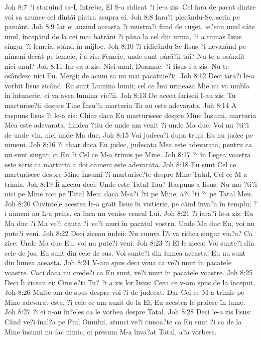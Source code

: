 Joh 8:7  ?i staruind sa-L întrebe, El S-a ridicat ?i le-a zis: Cel fara de pacat dintre voi sa arunce cel dintâi piatra asupra ei.
Joh 8:8  Iara?i plecându-Se, scria pe pamânt.
Joh 8:9  Iar ei auzind aceasta ?i mustra?i fiind de cuget, ie?eau unul câte unul, începând de la cei mai batrâni ?i pâna la cel din urma, ?i a ramas Iisus singur ?i femeia, stând în mijloc.
Joh 8:10  ?i ridicându-Se Iisus ?i nevazând pe nimeni decât pe femeie, i-a zis: Femeie, unde sunt pârâ?ii tai? Nu te-a osândit nici unul?
Joh 8:11  Iar ea a zis: Nici unul, Doamne. ?i Iisus i-a zis: Nu te osândesc nici Eu. Mergi; de acum sa nu mai pacatuie?ti.
Joh 8:12  Deci iara?i le-a vorbit Iisus zicând: Eu sunt Lumina lumii; cel ce Îmi urmeaza Mie nu va umbla în întuneric, ci va avea lumina vie?ii.
Joh 8:13  De aceea fariseii I-au zis: Tu marturise?ti despre Tine Însu?i; marturia Ta nu este adevarata.
Joh 8:14  A raspuns Iisus ?i le-a zis: Chiar daca Eu marturisesc despre Mine Însumi, marturia Mea este adevarata, fiindca ?tiu de unde am venit ?i unde Ma duc. Voi nu ?ti?i de unde vin, nici unde Ma duc.
Joh 8:15  Voi judeca?i dupa trup; Eu nu judec pe nimeni.
Joh 8:16  ?i chiar daca Eu judec, judecata Mea este adevarata, pentru ca nu sunt singur, ci Eu ?i Cel ce M-a trimis pe Mine.
Joh 8:17  ?i în Legea voastra este scris ca marturia a doi oameni este adevarata.
Joh 8:18  Eu sunt Cel ce marturisesc despre Mine Însumi ?i marturise?te despre Mine Tatal, Cel ce M-a trimis.
Joh 8:19  Îi ziceau deci: Unde este Tatal Tau? Raspuns-a Iisus: Nu ma ?ti?i nici pe Mine nici pe Tatal Meu; daca M-a?i ?ti pe Mine, a?i ?ti ?i pe Tatal Meu.
Joh 8:20  Cuvintele acestea le-a grait Iisus în vistierie, pe când înva?a în templu; ?i nimeni nu L-a prins, ca înca nu venise ceasul Lui.
Joh 8:21  ?i iara?i le-a zis: Eu Ma duc ?i Ma ve?i cauta ?i ve?i muri în pacatul vostru. Unde Ma duc Eu, voi nu pute?i veni.
Joh 8:22  Deci ziceau iudeii: Nu cumva Î?i va ridica singur via?a? Ca zice: Unde Ma duc Eu, voi nu pute?i veni.
Joh 8:23  ?i El le zicea: Voi sunte?i din cele de jos; Eu sunt din cele de sus. Voi sunte?i din lumea aceasta; Eu nu sunt din lumea aceasta.
Joh 8:24  V-am spus deci voua ca ve?i muri în pacatele voastre. Caci daca nu crede?i ca Eu sunt, ve?i muri în pacatele voastre.
Joh 8:25  Deci Îi ziceau ei: Cine e?ti Tu? ?i a zis lor Iisus: Ceea ce v-am spus de la început.
Joh 8:26  Multe am de spus despre voi ?i de judecat. Dar Cel ce M-a trimis pe Mine adevarat este, ?i cele ce am auzit de la El, Eu acestea le graiesc în lume.
Joh 8:27  ?i ei n-au în?eles ca le vorbea despre Tatal.
Joh 8:28  Deci le-a zis Iisus: Când ve?i înal?a pe Fiul Omului, atunci ve?i cunoa?te ca Eu sunt ?i ca de la Mine însumi nu fac nimic, ci precum M-a înva?at Tatal, a?a vorbesc.
